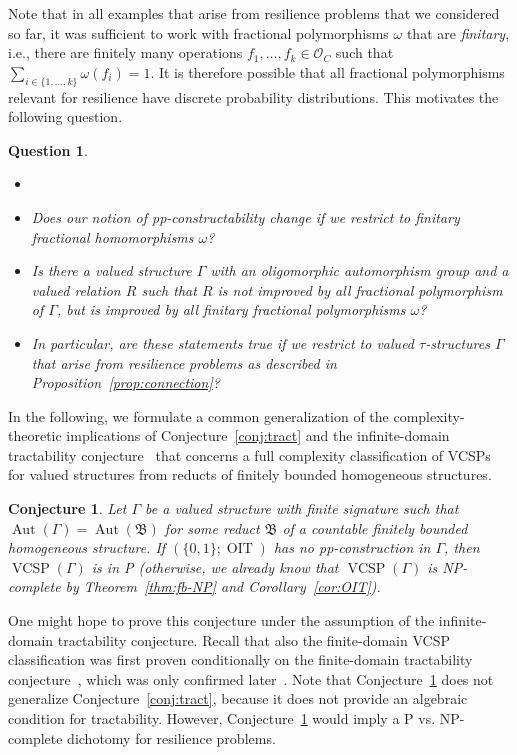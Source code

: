 \documentclass[nonacm]{acmart}
\newcommand{\bB}{{\mathfrak B}}
\DeclareMathOperator{\Aut}{Aut}
\DeclareMathOperator{\VCSP}{VCSP}
\DeclareMathOperator{\OIT}{OIT}
\newtheorem{conjecture}[theorem]{Conjecture}
\newtheorem{question}[theorem]{Question}
\begin{document}
Note that in all examples that arise from resilience problems that we considered so far, it was sufficient to work with fractional polymorphisms $\omega$ 
that are
\emph{finitary}, i.e., there are finitely many operations $f_1,\dots,f_k \in {\mathscr O}_C$ such that $\sum_{i \in \{1,\dots,k\}} \omega(f_i) = 1$. 
It is therefore possible that all fractional polymorphisms relevant for resilience have discrete probability distributions.
This motivates the following question.

\begin{question}\label{question:int-vs-fin-supp}
\begin{itemize}
\item[]%
\item Does our notion of pp-constructability change if we restrict to finitary fractional homomorphisms $\omega$?
\item Is there a valued structure $\Gamma$ with an oligomorphic automorphism group and a valued relation $R$ such that $R$ is
not improved by all fractional polymorphism of $\Gamma$, but \emph{is} 
improved by all finitary fractional polymorphisms $\omega$? 
\item In particular, 
are these statements 
true if we restrict to valued $\tau$-structures $\Gamma$ that arise from resilience problems as described in Proposition~\ref{prop:connection}?
\end{itemize}
\end{question}


In the following, we formulate a common generalization of the complexity-theoretic implications of Conjecture~\ref{conj:tract} and the infinite-domain tractability conjecture~\cite[Conjecture 1.2]{BPP-projective-homomorphisms} that concerns a full complexity classification of VCSPs for valued structures from reducts of finitely bounded homogeneous structures.
%
\begin{conjecture}\label{conj:VCSP}
Let $\Gamma$ be a valued structure with finite signature such that $\Aut(\Gamma) = \Aut(\bB)$
for some reduct $\bB$ of a countable finitely bounded homogeneous structure. If $(\{0,1\};\OIT)$ has no pp-construction in $\Gamma$, then $\VCSP(\Gamma)$ is in P (otherwise, we already know that $\VCSP(\Gamma)$ is NP-complete by Theorem~\ref{thm:fb-NP} and Corollary~\ref{cor:OIT}). 
\end{conjecture}

One might hope to prove this conjecture  under the assumption of the infinite-domain tractability conjecture. Recall that also the finite-domain VCSP classification was first proven conditionally on the finite-domain tractability conjecture~\cite{KolmogorovKR17,KozikOchremiak15}, which was only confirmed later~\cite{ZhukFVConjecture,BulatovFVConjecture}. Note that Conjecture~\ref{conj:VCSP} does not generalize Conjecture~\ref{conj:tract}, because it does not provide an algebraic condition for tractability. However, Conjecture~\ref{conj:VCSP} would imply a P vs. NP-complete dichotomy for resilience problems. 
\end{document}
